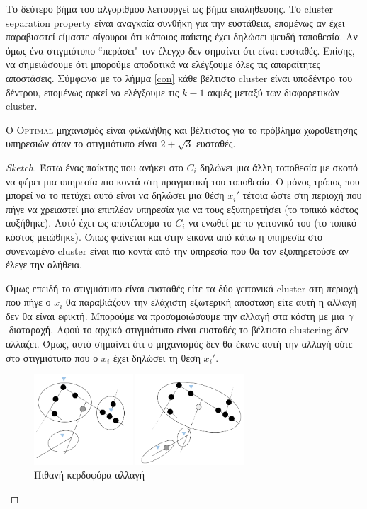 Το δεύτερο βήμα του αλγορίθμου λειτουργεί ως βήμα επαλήθευσης. Το cluster separation property είναι αναγκαία συνθήκη για την ευστάθεια, επομένως αν έχει παραβιαστεί είμαστε σίγουροι ότι κάποιος παίκτης έχει δηλώσει ψευδή τοποθεσία. Αν όμως ένα στιγμιότυπο ``περάσει" τον έλεγχο δεν σημαίνει ότι είναι ευσταθές. Επίσης, να σημειώσουμε ότι μπορούμε αποδοτικά να ελέγξουμε όλες τις απαραίτητες αποστάσεις. Σύμφωνα με το λήμμα \ref{con} κάθε βέλτιστο cluster είναι υποδέντρο του δέντρου, επομένως αρκεί να ελέγξουμε τις $k-1$ ακμές μεταξύ των διαφορετικών cluster.


\begin{theoremgr}
Ο \textsc{Optimal} μηχανισμός είναι φιλαλήθης και βέλτιστος για το πρόβλημα χωροθέτησης υπηρεσιών όταν το στιγμιότυπο είναι $2+\sqrt{3}$ ευσταθές.
\end{theoremgr}




\begin{proof}[Sketch]
Έστω ένας παίκτης που ανήκει στο $C_i$ δηλώνει μια άλλη τοποθεσία με σκοπό να φέρει μια υπηρεσία πιο κοντά στη πραγματική του τοποθεσία. Ο μόνος τρόπος που μπορεί να το πετύχει αυτό είναι να δηλώσει μια θέση $x_i'$ τέτοια ώστε στη περιοχή που πήγε να χρειαστεί μια επιπλέον υπηρεσία για να τους εξυπηρετήσει (το τοπικό κόστος αυξήθηκε). Αυτό έχει ως αποτέλεσμα το $C_i$ να ενωθεί με το γειτονικό του (το τοπικό κόστος μειώθηκε). Όπως φαίνεται και στην εικόνα από κάτω η υπηρεσία στο συνενωμένο cluster είναι πιο κοντά από την υπηρεσία που θα τον εξυπηρετούσε αν έλεγε την αλήθεια. 

Όμως επειδή το στιγμιότυπο είναι ευσταθές είτε τα δύο γειτονικά cluster στη περιοχή που πήγε ο $x_i$ θα παραβιάζουν την ελάχιστη εξωτερική απόσταση είτε αυτή η αλλαγή δεν θα είναι εφικτή. Μπορούμε να προσομοιώσουμε την αλλαγή στα κόστη με μια $\gamma$-διαταραχή. Αφού το αρχικό στιγμιότυπο είναι ευσταθές το βέλτιστο clustering δεν αλλάζει. Όμως, αυτό σημαίνει ότι ο μηχανισμός δεν θα έκανε αυτή την αλλαγή ούτε στο στιγμιότυπο που ο $x_i$ έχει δηλώσει τη θέση $x_i'$.


\begin{figure}[ht]
    \centering
    \includegraphics[width=0.7\textwidth]{Images/Deviation.png}
    \caption{Πιθανή κερδοφόρα αλλαγή}
    \label{fig:profDev}
\end{figure}
\end{proof}\


